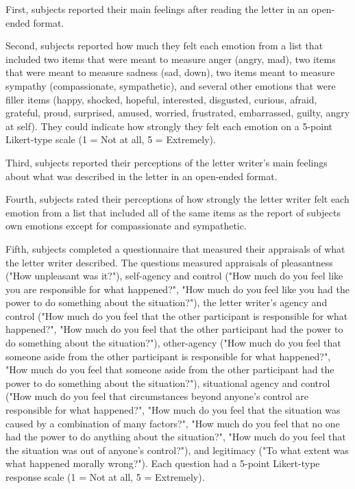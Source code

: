 \documentclass[man,a4paper,noextraspace,apacite]{apa6}\usepackage[]{graphicx}\usepackage[]{color}
\begin{document}
First, subjects reported their main feelings after reading the letter in an open-ended format.

Second, subjects reported how much they felt each emotion from a list that included two items that were meant to measure anger (angry, mad), two items that were meant to measure sadness (sad, down), two items meant to measure sympathy (compassionate, sympathetic), and several other emotions that were filler items (happy, shocked, hopeful, interested, disgusted, curious, afraid, grateful, proud, surprised, amused, worried, frustrated, embarrassed, guilty, angry at self). They could indicate how strongly they felt each emotion on a 5-point Likert-type scale (1 = Not at all, 5 = Extremely).

Third, subjects reported their perceptions of the letter writer's main feelings about what was described in the letter in an open-ended format.

Fourth, subjects rated their perceptions of how strongly the letter writer felt each emotion from a list that included all of the same items as the report of subjects own emotions except for compassionate and sympathetic.

Fifth, subjects completed a questionnaire that measured their appraisals of what the letter writer described. The questions measured appraisals of pleasantness ("How unpleasant was it?"), self-agency and control ("How much do you feel like you are responsible for what happened?", "How much do you feel like you had the power to do something about the situation?"), the letter writer's agency and control ("How much do you feel that the other participant is responsible for what happened?", "How much do you feel that the other participant had the power to do something about the situation?"), other-agency ("How much do you feel that someone aside from the other participant is responsible for what happened?", "How much do you feel that someone aside from the other participant had the power to do something about the situation?"), situational agency and control ("How much do you feel that circumstances beyond anyone's control are responsible for what happened?", "How much do you feel that the situation was caused by a combination of many factors?", "How much do you feel that no one had the power to do anything about the situation?", "How much do you feel that the situation was out of anyone's control?"), and legitimacy ("To what extent was what happened morally wrong?"). Each question had a 5-point Likert-type response scale (1 = Not at all, 5 = Extremely).
\end{document}
